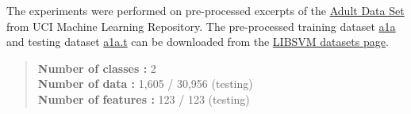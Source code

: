 \documentclass{article}
\begin{document}
	The experiments were performed on pre-processed excerpts of the \href{https://archive.ics.uci.edu/ml/datasets/adult}{Adult Data Set} from UCI Machine Learning Repository. The pre-processed training dataset \href{https://www.csie.ntu.edu.tw/~cjlin/libsvmtools/datasets/binary/a1a}{a1a} and testing dataset \href{https://www.csie.ntu.edu.tw/~cjlin/libsvmtools/datasets/binary/a1a.t}{a1a.t} can be downloaded from the \href{https://www.csie.ntu.edu.tw/~cjlin/libsvmtools/datasets/binary.html}{LIBSVM datasets page}.
	
	\begin{quote}
		\textbf{Number of classes  :} 2 \\
		\textbf{Number of data     :} 1,605 / 30,956 (testing) \\
		\textbf{Number of features :} 123 / 123 (testing)
	\end{quote}
	
\end{document}
